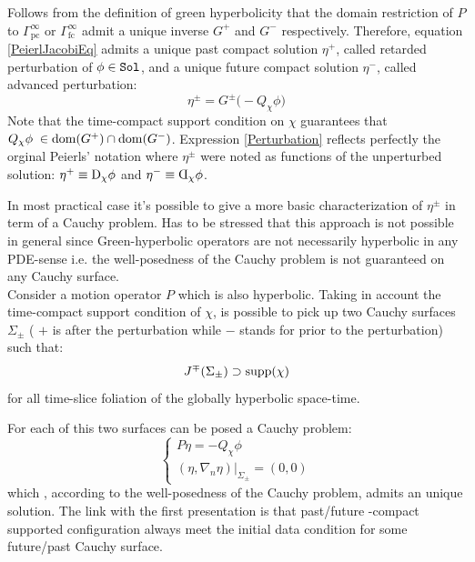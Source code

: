 \documentclass[Main]{subfiles}
\begin{document}
		 Follows from the definition of green hyperbolicity that the domain restriction of $P$ to $\Gamma^\infty_{\textrm{pc}}$ or $\Gamma^\infty_{\textrm{fc}}$ admit a unique inverse $G^+$ and $G^-$ respectively.
   		Therefore, equation \ref{PeierlJacobiEq} admits a unique past compact solution $\eta^+$, called retarded perturbation of $\phi\in \mathtt{Sol}$, and a unique future compact solution $\eta^-$, called advanced perturbation:
   		\begin{equation}\label{Perturbation}
   			\eta^\pm = G^\pm \big( - Q_\chi \phi \big)
   		\end{equation}
   		Note that the time-compact support condition on $\chi$ guarantees that $Q_\chi \phi \; \in \mathrm{dom}(G^+) \cap \mathrm{dom}(G^-)$.
   		Expression \ref{Perturbation} reflects perfectly the orginal Peierls' notation where $\eta^\pm$ were noted as functions of the unperturbed solution: $\eta^+ \equiv\reflectbox{\reflectbox{D}}_\chi \phi$ and $\eta^- \equiv  \reflectbox{D}_\chi \phi$.
		
		
		\begin{observation}
			In most practical case it's possible to give a more basic characterization of $\eta^\pm$ in term of a Cauchy problem.
			Has to be stressed that this approach is not possible in general since Green-hyperbolic operators are not necessarily hyperbolic in any PDE-sense i.e. the well-posedness of the Cauchy problem is not guaranteed on any Cauchy surface. \cite[pag 1]{Bar} \cite[remark 3.18]{Bar2010}\cite[remark 2.1]{Khavkine2014}
			\\
			Consider a motion operator $P$ which is also hyperbolic.
		Taking in account the time-compact support condition of $\chi$, is possible to pick up  two Cauchy surfaces $\Sigma_\pm$ ( $+$ is after the perturbation while $-$ stands for prior to the perturbation) such that:
		\begin{displaymath}
			J^\mp (\Sigma_\pm) \supset \textrm{supp}(\chi) 
		\end{displaymath}
		for all time-slice foliation of the globally hyperbolic space-time.

		For each of this two surfaces can be posed a Cauchy problem:
		\begin{equation}\label{PerturbationCauchyProblem}
		   \begin{cases}
			   P \eta = - Q_\chi \phi \\
			   (\eta, \nabla_n \eta ) \big \vert_{\Sigma_{\pm}} = (0,0)
   			\end{cases}
   		\end{equation}
   		which , according to the well-posedness of the Cauchy problem, admits an unique solution.
   		The link with the first presentation is that past/future -compact supported configuration always meet the initial data condition for some future/past Cauchy surface.
		\end{observation}
		
\end{document}

